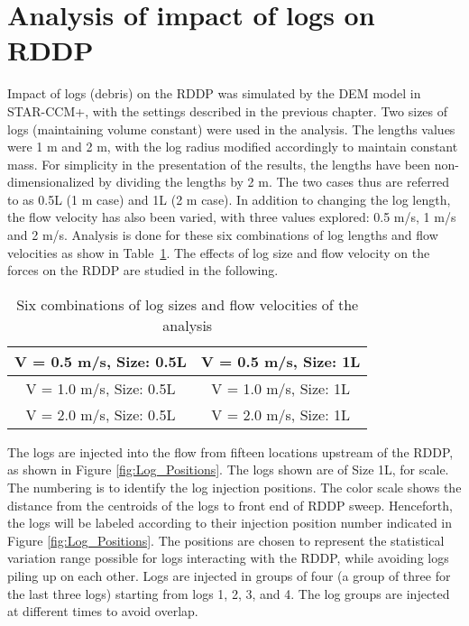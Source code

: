 \newpage
\FloatBarrier
\section{Analysis of impact of logs on RDDP}
Impact of logs (debris) on the RDDP was simulated by the DEM model in STAR-CCM+, with the settings described in the previous chapter. Two sizes of logs (maintaining volume constant) were used in the analysis. The lengths values were 1 m and 2 m, with the log radius modified accordingly to maintain constant mass. For simplicity in the presentation of the results, the lengths have been non-dimensionalized by dividing the lengths by 2 m. The two cases thus are referred to as 0.5L (1 m case) and 1L (2 m case). In addition to changing the log length, the flow velocity has also been varied, with three values explored: 0.5 m/s, 1 m/s and 2 m/s. Analysis is done for these six combinations of log lengths and flow velocities as show in Table~\ref{StudyDesignMatrix}. The effects of log size and flow velocity on the forces on the RDDP are studied in the following.

\begin{table}
\centering
\caption{Six combinations of log sizes and flow velocities of the analysis}
\label{case combination}
\begin{tabular}{|c|c|}
\hline
V = 0.5 m/s, Size: 0.5L & V = 0.5 m/s, Size: 1L \\ \hline
V = 1.0 m/s, Size: 0.5L & V = 1.0 m/s, Size: 1L \\ \hline
V = 2.0 m/s, Size: 0.5L & V = 2.0 m/s, Size: 1L \\\hline
\end{tabular}
\label{StudyDesignMatrix}
\end{table}

The logs are injected into the flow from fifteen locations upstream of the RDDP, as shown in Figure \ref{fig:Log_Positions}. The logs shown are of Size 1L, for scale. The numbering is to identify the log injection positions. The color scale shows the distance from the centroids of the logs to front end of RDDP sweep. Henceforth, the logs will be labeled according to their injection position number indicated in Figure \ref{fig:Log_Positions}. The positions are chosen to represent the statistical variation range possible for logs interacting with the RDDP, while avoiding logs piling up on each other. Logs are injected in groups of four (a group of three for the last three logs) starting from logs 1, 2, 3, and 4. The log groups are injected at different times to avoid overlap. 

